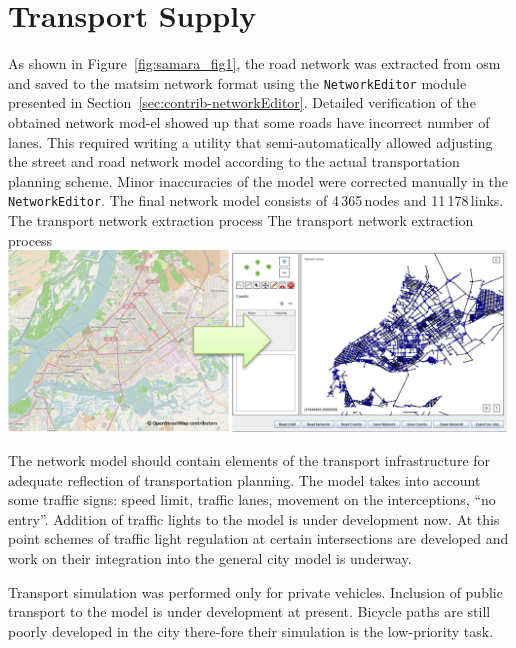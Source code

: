 \section{Transport Supply}
As shown in Figure~\ref{fig:samara_fig1}, the road network was extracted from \gls{osm} and saved to the \gls{matsim} network format using the \lstinline|NetworkEditor| module presented in Section~\ref{sec:contrib-networkEditor}. 
Detailed verification of the obtained network mod-el showed up that some roads have incorrect number of lanes. This required writing a utility that semi-automatically allowed adjusting the street and road network model according to the actual transportation planning scheme. Minor inaccuracies of the model were corrected manually in the \lstinline|NetworkEditor|. The final network model consists of 4\,365\,nodes and 11\,178\,links.
%
\createfigure%
{The transport network extraction process}%
{The transport network extraction process}%
{\label{fig:samara_fig1}}%
{\includegraphics[width=0.99\textwidth, angle=0]{./scenarios/figures/samara_fig1.png}}%
{}

The network model should contain elements of the transport infrastructure for adequate reflection of transportation planning. The model takes into account some traffic signs: speed limit, traffic lanes, movement on the interceptions, ``no entry''. Addition of traffic lights to the model is under development now. At this point schemes of traffic light regulation at certain intersections are developed and work on their integration into the general city model is underway.

Transport simulation was performed only for private vehicles. Inclusion of public transport to the model is under development at present. Bicycle paths are still poorly developed in the city there-fore their simulation is the low-priority task. 

